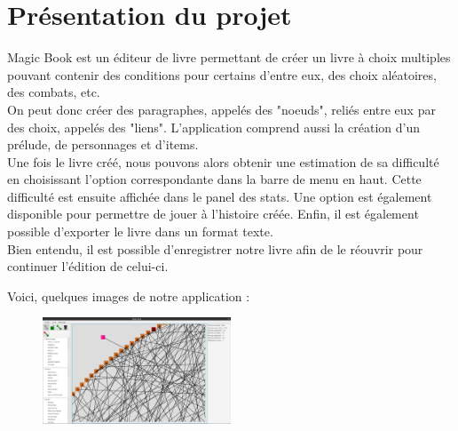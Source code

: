 \chapter{Présentation du projet}

        Magic Book est un éditeur de livre permettant de créer un livre à choix multiples pouvant contenir des conditions pour certains d'entre eux, des choix aléatoires, des combats, etc.\\
        On peut donc créer des paragraphes, appelés des "noeuds", reliés entre eux par des choix, appelés des "liens". L'application comprend aussi la création d'un prélude, de personnages et d'items.\\
        Une fois le livre créé, nous pouvons alors obtenir une estimation de sa difficulté en choisissant l'option correspondante dans la barre de menu en haut. Cette difficulté est ensuite affichée dans le panel des stats. Une option est également disponible pour permettre de jouer à l'histoire créée. Enfin, il est également possible d'exporter le livre dans un format texte.\\
        Bien entendu, il est possible d'enregistrer notre livre afin de le réouvrir pour continuer l'édition de celui-ci.

		\noindent Voici, quelques images de notre application :

		\begin{figure}[H]
			\centering\includegraphics[width=0.5\textwidth]{img/editeur.png}
		\end{figure}

